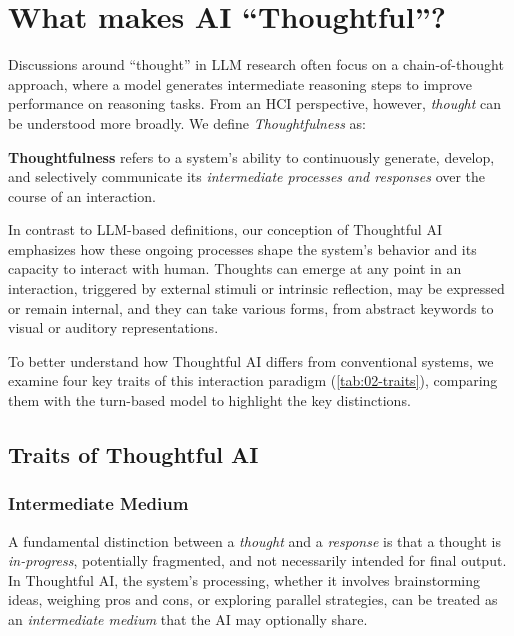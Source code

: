 \section{What makes AI ``Thoughtful''?}


Discussions around ``thought'' in LLM research often focus on a chain-of-thought approach, where a model generates intermediate reasoning steps to improve performance on reasoning tasks. From an HCI perspective, however, \textit{thought} can be understood more broadly. We define \textit{Thoughtfulness} as:

\newtheorem{thoughtfuldefinition}{Definition}
\begin{definition}
\textbf{Thoughtfulness} refers to a system's ability to continuously generate, develop, and selectively communicate its \textit{intermediate processes and responses} over the course of an interaction. 
\end{definition}


In contrast to LLM-based definitions, our conception of Thoughtful AI emphasizes how these ongoing processes shape the system’s behavior and its capacity to interact with human. Thoughts can emerge at any point in an interaction, triggered by external stimuli or intrinsic reflection, may be expressed or remain internal, and they can take various forms, from abstract keywords to visual or auditory representations.


To better understand how Thoughtful AI differs from conventional systems, we examine four key traits of this interaction paradigm (\autoref{tab:02-traits}), comparing them with the turn-based model to highlight the key distinctions.


\subsection{Traits of Thoughtful AI}



\subsubsection{Intermediate Medium}
A fundamental distinction between a \textit{thought} and a \textit{response} is that a thought is \textit{in-progress}, potentially fragmented, and not necessarily intended for final output. In Thoughtful AI, the system’s processing, whether it involves brainstorming ideas, weighing pros and cons, or exploring parallel strategies, can be treated as an \textit{intermediate medium} that the AI may optionally share.

